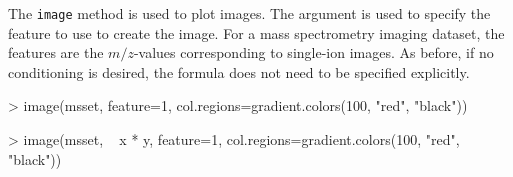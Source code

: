\documentclass{article}
\begin{document}
The \verb|image| method is used to plot images. The  argument is used to specify the feature to use to create the image. For a mass spectrometry imaging dataset, the features are the $m/z$-values corresponding to single-ion images. As before, if no conditioning is desired, the formula does not need to be specified explicitly.
\begin{Schunk}
\begin{Sinput}
> image(msset, feature=1, col.regions=gradient.colors(100, "red", "black"))
\end{Sinput}
\end{Schunk}
\begin{Schunk}
\begin{Sinput}
> image(msset, ~ x * y, feature=1, col.regions=gradient.colors(100, "red", "black"))
\end{Sinput}
\end{Schunk}
\end{document}
